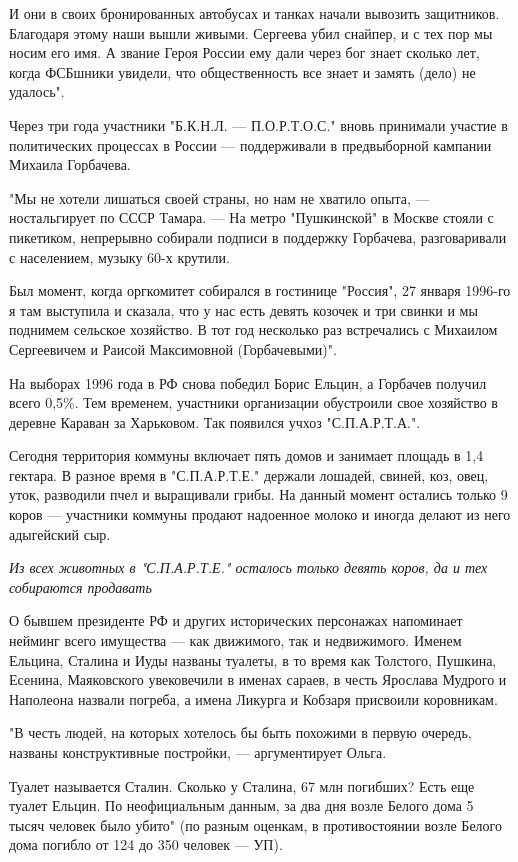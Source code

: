 И они в своих бронированных автобусах и танках начали вывозить защитников.
Благодаря этому наши вышли живыми. Сергеева убил снайпер, и с тех пор мы носим
его имя. А звание Героя России ему дали через бог знает сколько лет, когда
ФСБшники увидели, что общественность все знает и замять (дело) не удалось".

Через три года участники "Б.К.Н.Л. --- П.О.Р.Т.О.С." вновь принимали участие в
политических процессах в России --- поддерживали в предвыборной кампании Михаила
Горбачева.

"Мы не хотели лишаться своей страны, но нам не хватило опыта, --- ностальгирует
по СССР Тамара. --- На метро "Пушкинской" в Москве стояли с пикетиком, непрерывно
собирали подписи в поддержку Горбачева, разговаривали с населением, музыку 60-х
крутили. 

Был момент, когда оргкомитет собирался в гостинице "Россия", 27 января 1996-го
я там выступила и сказала, что у нас есть девять козочек и три свинки и мы
поднимем сельское хозяйство. В тот год несколько раз встречались с Михаилом
Сергеевичем и Раисой Максимовной (Горбачевыми)".

На выборах 1996 года в РФ снова победил Борис Ельцин, а Горбачев получил всего
0,5\%. Тем временем, участники организации обустроили свое хозяйство в деревне
Караван за Харьковом. Так появился учхоз "С.П.А.Р.Т.А.".

Сегодня территория коммуны включает пять домов и занимает площадь в 1,4
гектара. В разное время в "С.П.А.Р.Т.Е." держали лошадей, свиней, коз, овец,
уток, разводили пчел и выращивали грибы. На данный момент остались только 9
коров --- участники коммуны продают надоенное молоко и иногда делают из него
адыгейский сыр.

{\em
Из всех животных в "С.П.А.Р.Т.Е." осталось только девять коров, да и тех собираются продавать
\/}

О бывшем президенте РФ и других исторических персонажах напоминает нейминг
всего имущества --- как движимого, так и недвижимого. Именем Ельцина, Сталина и
Иуды названы туалеты, в то время как Толстого, Пушкина, Есенина, Маяковского
увековечили в именах сараев, в честь Ярослава Мудрого и Наполеона назвали
погреба, а имена Ликурга и Кобзаря присвоили коровникам.

"В честь людей, на которых хотелось бы быть похожими в первую очередь, названы
конструктивные постройки, --- аргументирует Ольга.

Туалет называется Сталин. Сколько у Сталина, 67 млн погибших? Есть еще туалет
Ельцин. По неофициальным данным, за два дня возле Белого дома 5 тысяч человек
было убито" (по разным оценкам, в противостоянии возле Белого дома погибло от
124 до 350 человек --- УП).

